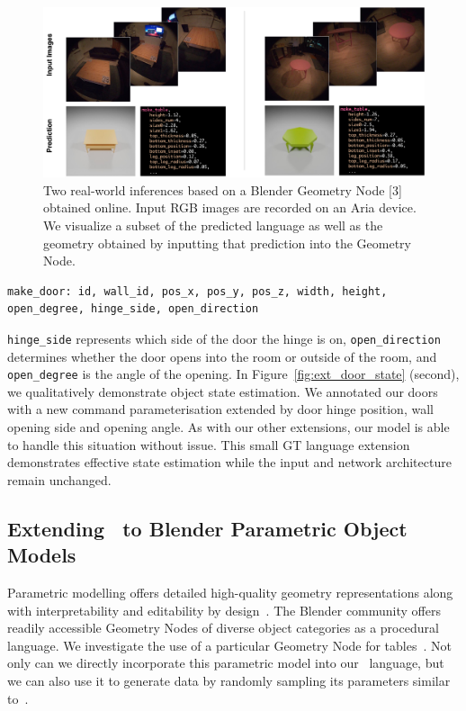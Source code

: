 \begin{figure}[t]
    \centering
    \includegraphics[width=\columnwidth]{figs/blender_horiz.pdf}
    \caption{Two real-world inferences based on a Blender Geometry Node [3] obtained online. Input RGB images are recorded on an Aria device. We visualize a subset of the predicted language as well as the geometry obtained by inputting that prediction into the Geometry Node.}
    \label{fig:ext_blender}
\end{figure}


\begin{lstlisting}[language=StructuredLanguage]
make_door: id, wall_id, pos_x, pos_y, pos_z, width, height, open_degree, hinge_side, open_direction
\end{lstlisting}
\texttt{hinge\_side} represents which side of the door the hinge is on, \texttt{open\_direction} determines whether the door opens into the room or outside of the room, and \texttt{open\_degree} is the angle of the opening.
In Figure~\ref{fig:ext_door_state} (second),
we qualitatively demonstrate object state estimation.
We annotated our doors
with a new command parameterisation
extended by door hinge position, wall opening side and opening angle.
As with our other extensions,
our model is able to handle this situation without issue.
This small GT language extension demonstrates effective state estimation
while the input and network architecture remain unchanged.

\subsection{Extending \METHOD~to Blender Parametric Object Models}

Parametric modelling offers detailed high-quality geometry representations along with interpretability and editability by design~\cite{jones2020shapeassembly,jones2021shapemod,jones2022plad,pearl2022geocode}. 
The Blender community offers readily accessible Geometry Nodes of diverse object categories as a procedural language.
We investigate the use of a particular Geometry Node for tables~\cite{mrBash2023Tables}.
Not only can we directly incorporate this parametric model
into our \METHOD~language,
but we can also use it to generate data
by randomly sampling its parameters
similar to~\cite{pearl2022geocode}. 

